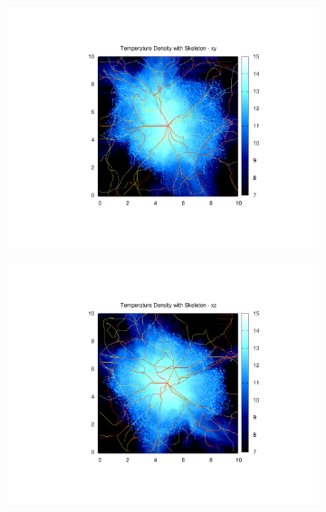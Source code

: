 \documentclass[journal]{IEEEtran}
\begin{document}
\begin{figure}[!t]
\begin{subfigure}[t]{0.3\textwidth}
		\includegraphics[width=\linewidth]{TempDenSkelxy}
	\end{subfigure}
	\quad
	\begin{subfigure}[t]{0.3\textwidth}
		\centering
		\includegraphics[width=\linewidth]{TempDenSkelxz}
	\end{subfigure}
	\quad
	\begin{subfigure}[t]{0.3\textwidth}
		\centering

\end{subfigure}
\end{figure}
\end{document}
